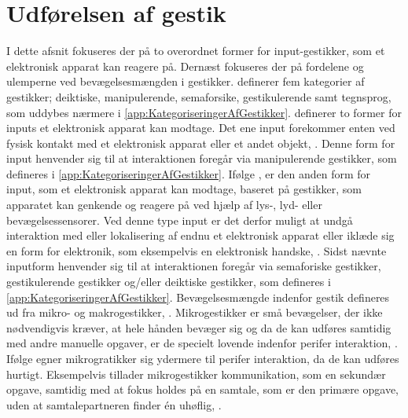 \section{Udførelsen af gestik}
\label{UdfoerelseAfGestik}
%
I dette afsnit fokuseres der på to overordnet former for input-gestikker, som et elektronisk apparat kan reagere på. Dernæst fokuseres der på fordelene og ulemperne ved bevægelsesmængden i gestikker. \textcite[s. 9]{PDF:ATaxonomyOfGestures} definerer fem kategorier af gestikker; deiktiske, manipulerende, semaforsike, gestikulerende samt tegnsprog, som uddybes nærmere i \autoref{app:KategoriseringerAfGestikker}. \blankline
%
\textcite[s. 9]{PDF:ATaxonomyOfGestures} definerer to former for inputs et elektronisk apparat kan modtage. Det ene input forekommer enten ved fysisk kontakt med et elektronisk apparat eller et andet objekt, \parencite[s. 10]{PDF:ATaxonomyOfGestures}. Denne form for input henvender sig til at interaktionen foregår via manipulerende gestikker, som defineres i \autoref{app:KategoriseringerAfGestikker}. Ifølge \textcite[s. 12]{PDF:ATaxonomyOfGestures}, er den anden form for input, som et elektronisk apparat kan modtage, baseret på gestikker, som apparatet kan genkende og reagere på ved hjælp af lys-, lyd- eller bevægelsessensorer. Ved denne type input er det derfor muligt at undgå interaktion med eller lokalisering af endnu et elektronisk apparat eller iklæde sig en form for elektronik, som eksempelvis en elektronisk handske, \parencite[s. 12]{PDF:ATaxonomyOfGestures}. Sidst nævnte inputform henvender sig til at interaktionen foregår via semaforiske gestikker, gestikulerende gestikker og/eller deiktiske gestikker, som defineres i \autoref{app:KategoriseringerAfGestikker}. \blankline
%
Bevægelsesmængde indenfor gestik defineres ud fra mikro- og makrogestikker, \parencite[s. 6]{PDF:UsabilityofMicroVsMacroGestures}. Mikrogestikker er små bevægelser, der ikke nødvendigvis kræver, at hele hånden bevæger sig og da de kan udføres samtidig med andre manuelle opgaver, er de specielt lovende indenfor perifer interaktion, \parencite[s. 95]{PDF:PIMicrogesturesKap5}. Ifølge \textcite[s. 96]{PDF:PIMicrogesturesKap5} egner mikrogratikker sig ydermere til perifer interaktion, da de kan udføres hurtigt. Eksempelvis tillader mikrogestikker kommunikation, som en sekundær opgave, samtidig med at fokus holdes på en samtale, som er den primære opgave, uden at samtalepartneren finder én uhøflig, \parencite[s. 97]{PDF:PIMicrogesturesKap5}.

